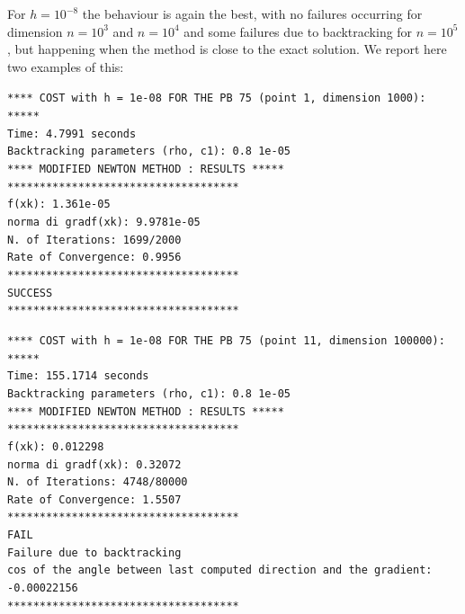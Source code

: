 For $h=10^{-8}$ the behaviour is again the best, with no failures occurring for dimension $n=10^3$ and $n=10^4$ and some failures due to backtracking 
for $n=10^5$, but happening when the method is close to the exact solution. We report here two examples of this:
\begin{list}{}{\setlength{\leftmargin}{0.7cm}}
    \item \texttt{**** COST with h = 1e-08 FOR THE PB 75 (point 1, dimension 1000):  *****\\
    Time: 4.7991 seconds\\
    Backtracking parameters (rho, c1): 0.8 1e-05\\
    **** MODIFIED NEWTON METHOD : RESULTS *****\\
    ************************************\\
    f(xk): 1.361e-05\\
    norma di gradf(xk): 9.9781e-05\\
    N. of Iterations: 1699/2000\\
    Rate of Convergence: 0.9956\\
    ************************************\\
    SUCCESS\\
    ************************************\\
    } 
\end{list}
\begin{list}{}{\setlength{\leftmargin}{0.7cm}}
    \item \texttt{**** COST with h = 1e-08 FOR THE PB 75 (point 11, dimension 100000):  *****\\
    Time: 155.1714 seconds\\
    Backtracking parameters (rho, c1): 0.8 1e-05\\
    **** MODIFIED NEWTON METHOD : RESULTS *****\\
    ************************************\\
    f(xk): 0.012298\\
    norma di gradf(xk): 0.32072\\
    N. of Iterations: 4748/80000\\
    Rate of Convergence: 1.5507\\
    ************************************\\
    FAIL\\
    Failure due to backtracking\\
    cos of the angle between last computed direction and the gradient: -0.00022156\\
    ************************************}
\end{list}
